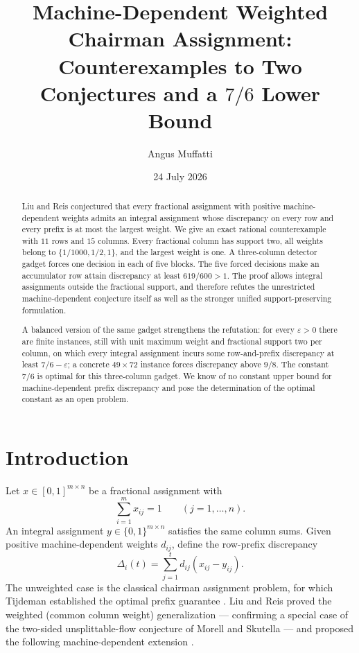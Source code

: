 \documentclass[11pt]{article}
\title{Machine-Dependent Weighted Chairman Assignment:\\
Counterexamples to Two Conjectures and a $7/6$ Lower Bound}
\author{Angus Muffatti}
\date{24 July 2026}
\theoremstyle{definition}
\newcommand{\disc}{\Delta}
\begin{document}
\maketitle

\begin{abstract}
Liu and Reis conjectured that every fractional assignment with positive
machine-dependent weights admits an integral assignment whose discrepancy on
every row and every prefix is at most the largest weight.  We give an exact
rational counterexample with $11$ rows and $15$ columns.  Every fractional
column has support two, all weights belong to
$\{1/1000,1/2,1\}$, and the largest weight is one.  A three-column detector
gadget forces one decision in each of five blocks.  The five forced decisions
make an accumulator row attain discrepancy at least
$619/600>1$.  The proof allows integral assignments outside the fractional
support, and therefore refutes the unrestricted machine-dependent conjecture
itself as well as the stronger unified support-preserving formulation.

A balanced version of the same gadget strengthens the refutation: for every
$\varepsilon>0$ there are finite instances, still with unit maximum weight
and fractional support two per column, on which every integral assignment
incurs some row-and-prefix discrepancy at least $7/6-\varepsilon$; a concrete
$49\times72$ instance forces discrepancy above $9/8$.  The constant $7/6$ is
optimal for this three-column gadget.  We know of no constant upper bound for
machine-dependent prefix discrepancy and pose the determination of the
optimal constant as an open problem.
\end{abstract}

\section{Introduction}

Let $x\in[0,1]^{m\times n}$ be a fractional assignment with
\[
 \sum_{i=1}^m x_{ij}=1\qquad(j=1,\ldots,n).
\]
An integral assignment $y\in\{0,1\}^{m\times n}$ satisfies the same column
sums.  Given positive machine-dependent weights $d_{ij}$, define the
row-prefix discrepancy
\[
 \disc_i(t)=\sum_{j=1}^t d_{ij}(x_{ij}-y_{ij}).
\]
The unweighted case is the classical chairman assignment problem, for which
Tijdeman established the optimal prefix guarantee \citep{Tijdeman1980}.  Liu
and Reis proved the weighted (common column weight) generalization —
confirming a special case of the two-sided unsplittable-flow conjecture of
Morell and Skutella \citep{MorellSkutella2022} — and proposed the following
machine-dependent extension \citep{LiuReis2026}.
\end{document}

